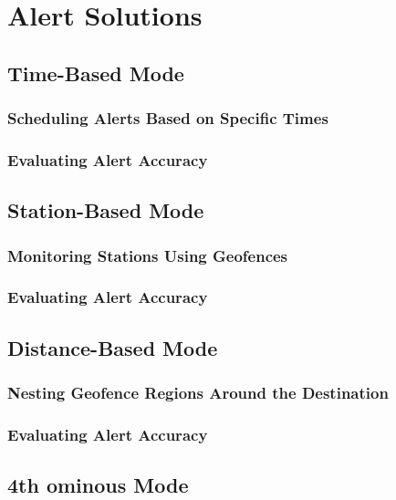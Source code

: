 \chapter{Alert Solutions}
\label{cha:AlertSolutions}

\section{Time-Based Mode}
\subsection{Scheduling Alerts Based on Specific Times}
\subsection{Evaluating Alert Accuracy}

\section{Station-Based Mode}
\subsection{Monitoring Stations Using Geofences}
\subsection{Evaluating Alert Accuracy}

\section{Distance-Based Mode}
\subsection{Nesting Geofence Regions Around the Destination}
\subsection{Evaluating Alert Accuracy}

\section{4th ominous Mode}


